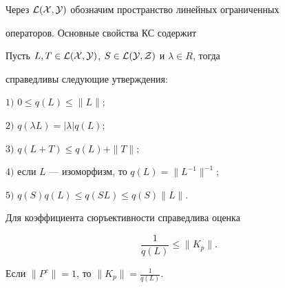  


Через $\cal L(X,Y)$ обозначим пространство линейных ограниченных 


операторов. Основные свойства КС содержит 


 


\begin{lem} 


Пусть $L,T\in\cal L(X,Y)$, $S\in\cal L(Y,Z)$ и $\lambda\in R$, тогда 


справедливы следующие утверждения${:}$ 


 


$1)$ $0\le q(L)\le\|L\|;$ 


 


$2)$ $q(\lambda L)=|\lambda|q(L);$ 


 


$3)$ $q(L+T)\le q(L)+\|T\|;$ 


 


$4)$ если $L$ --- изоморфизм, то $q(L)=\|L^{-1}\|^{-1};$ 


 


$5)$ $q(S)q(L)\le q(S L)\le q(S)\|L\|$. 


\end{lem} 


 


\begin{thm} 


Для коэффициента сюръективности справедлива оценка 


\begin{equation} 


\frac{1}{q(L)}\le\|K_p\|. 


\end{equation} 


Если $\|P^c\|=1$, то $\|K_p\|=\frac{1}{q(L)}$. 


\end{thm} 


 


